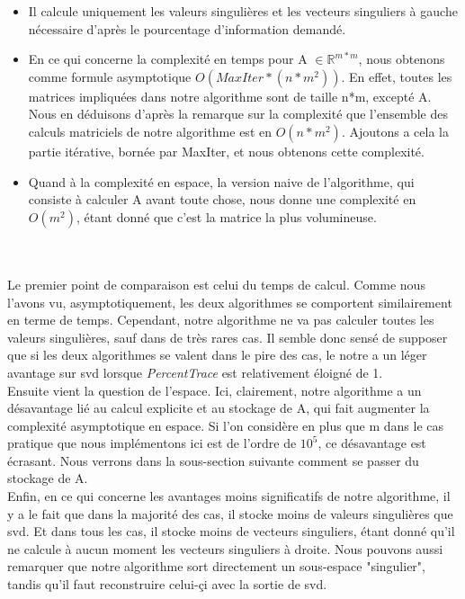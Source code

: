 \documentclass[a4paper,12pt]{article}
\begin{document}
        \begin{itemize}
            \item Il calcule uniquement les valeurs singulières et les vecteurs singuliers à gauche nécessaire d'après le pourcentage d'information demandé.
            \item En ce qui concerne la complexité en temps pour A $\in \mathbb{R}^{m*m}$, nous obtenons comme formule asymptotique $O(MaxIter*(n*m^2))$. En effet, toutes les matrices impliquées dans notre algorithme sont de taille n*m, excepté A. Nous en déduisons d'après la remarque sur la complexité que l'ensemble des calculs matriciels de notre algorithme est en $O(n*m^2)$. Ajoutons a cela la partie itérative, bornée par MaxIter, et nous obtenons cette complexité.
            \item Quand à la complexité en espace, la version naive de l'algorithme, qui consiste à calculer A avant toute chose, nous donne une complexité en $O(m^2)$, étant donné que c'est la matrice la plus volumineuse.
        \end{itemize}
\bigskip
\ \\
\ \\
    Le premier point de comparaison est celui du temps de calcul. Comme nous l'avons vu, asymptotiquement, les deux algorithmes se comportent similairement en terme de temps. Cependant, notre algorithme ne va pas calculer toutes les valeurs singulières, sauf dans de très rares cas. Il semble donc sensé de supposer que si les deux algorithmes se valent dans le pire des cas, le notre a un léger avantage sur svd lorsque \textit{PercentTrace} est relativement éloigné de 1. \\

    Ensuite vient la question de l'espace. Ici, clairement, notre algorithme a un désavantage lié au calcul explicite et au stockage de A, qui fait augmenter la complexité asymptotique en espace. Si l'on considère en plus que m dans le cas pratique que nous implémentons ici est de l'ordre de $10^5$, ce désavantage est écrasant. Nous verrons dans la sous-section suivante comment se passer du stockage de A. \\

    Enfin, en ce qui concerne les avantages moins significatifs de notre algorithme, il y a le fait que dans la majorité des cas, il stocke moins de valeurs singulières que svd. Et dans tous les cas, il stocke moins de vecteurs singuliers, étant donné qu'il ne calcule à aucun moment les vecteurs singuliers à droite. Nous pouvons aussi remarquer que notre algorithme sort directement un sous-espace "singulier", tandis qu'il faut reconstruire celui-çi avec la sortie de svd.
\end{document}
